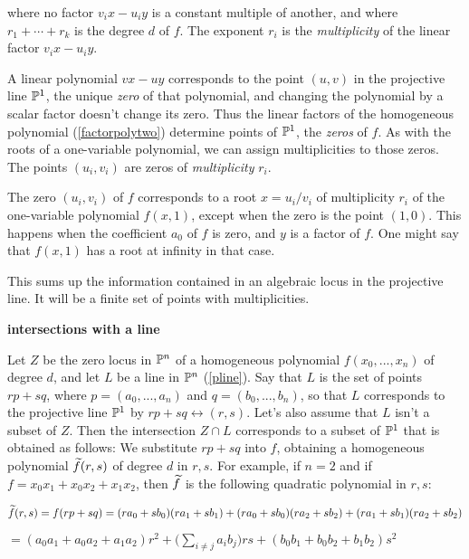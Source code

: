 \documentclass[leqno]{book}
\newcommand\Marginnote[1]{\marginnote{\hspace{-12pt}\normalfont{#1}}}
\renewcommand\theequation{\thesection.\arabic{equation}}
\newenvironment{boldequation}{\renewcommand\theequation{\textbf{\thesection.\arabic{equation}}}\equation}
   {\endequation}
\theoremstyle{definition}%
\numberwithin{equation}{section}
\theoremstyle{theorem} %
\begin{document}
\no
where no factor $v_ix-u_iy$ is a constant multiple of another, and
where $r_1+\cdots + r_k$ is the degree $d$ of $f$.
The exponent $r_i$ is  the {\it multiplicity}
of the linear factor $v_ix-u_iy$.

A linear polynomial $vx-uy$ corresponds to the point $(u,v)$ in the
 projective line $\mathbb{P}^1$, the unique {\it zero} of that polynomial,
 and changing the polynomial by a scalar factor doesn't change its zero.
 Thus the linear factors of the homogeneous polynomial
 (\ref{factorpolytwo}) determine points of $\mathbb{P}^1$, the {\it zeros}
 of $f$.  As with the roots of a one-variable polynomial, we can
 assign multiplicities to those zeros.  The points $(u_i,v_i)$ are
 zeros of {\it multiplicity} $r_i$.

The zero $(u_i,v_i)$ of $f$ corresponds to a root $x=u_i/v_i$ of
multiplicity $r_i$ of the one-variable polynomial $f(x,1)$, except
when the zero is the point $(1,0)$.  This happens when the coefficient
$a_0$ of $f$ is zero, and $y$ is a factor of $f$.  One
might say that $f(x,1)$ has a root at infinity in that case.

This sums up the information contained in an algebraic locus in the
projective line.  It will be a finite set of points with
multiplicities.

\begin{boldequation}
\hspace{-9cm} \textbf{intersections with a line}
\Marginnote{intersectline}\label{intersectline}
\end{boldequation}


\bs Let $Z$ be the zero locus in $\mathbb{P}^n$ of a homogeneous polynomial
$f(x_0,...,x_n)$ of degree $d$, and let $L$ be a line in $\mathbb{P}^n$
(\ref{pline}).
Say that $L$ is the set of points $rp+sq$, where $p=(a_0,...,a_n)$ and
$q = (b_0,...,b_n)$, so that $L$ corresponds to the projective line
$\mathbb{P}^1$ by $rp+sq \leftrightarrow (r,s)$.  Let's also assume that $L$
isn't a subset of $Z$.  Then the intersection $Z \cap L$ corresponds
to a subset of $\mathbb{P}^1$ that is obtained as follows: We substitute
$rp+sq$ into $f$, obtaining a homogeneous polynomial $\widetilde f(r,s)$ of
degree $d$ in $r,s$.  For example, if $n=2$ and if $f =
x_0x_1\!+\!x_0x_2\!+\!x_1x_2$, then $\widetilde f$ is the following quadratic
polynomial in $r,s$:

\ms
\centerline{$\widetilde f(r,s) = f(rp+sq) = (ra_0+sb_0)(ra_1+sb_1) +
(ra_0+sb_0)(ra_2+sb_2) + (ra_1+sb_1)(ra_2+sb_2)$}

\ms
\centerline{\quad\quad\quad\quad$ = (a_0a_1\!+\!a_0a_2\!+\!a_1a_2)r^2 +
\big(\sum_{i\neq j}a_ib_j\big)rs + (b_0b_1\!+\!b_0b_2\!+\!b_1b_2)s^2 $}
\end{document}
